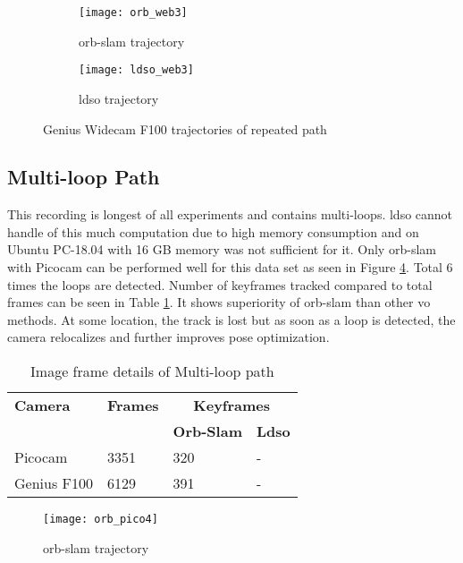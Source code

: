 \begin{figure}[H]
	\begin{subfigure}{.5\textwidth}
		\centering
		\texttt{[image: orb\_web3]}
		\caption{\acrshort{orb}-\acrshort{slam} trajectory}
		\label{fig:orb_web3}
	\end{subfigure}%
	\begin{subfigure}{.5\textwidth}
		\centering
		\texttt{[image: ldso\_web3]}
		\caption{\acrshort{ldso} trajectory}
		\label{fig:ldso_web3}
	\end{subfigure}
	\caption{Genius Widecam F100 trajectories of repeated path}
	\label{fig:Web3}
\end{figure}

\subsection{Multi-loop Path}
This recording is longest of all experiments and contains multi-loops. \acrshort{ldso} cannot handle of this much computation due to high memory consumption and on Ubuntu PC-18.04 with 16 GB memory was not sufficient for it. Only \acrshort{orb}-\acrshort{slam} with Picocam can be performed well for this data set as seen in Figure \ref{fig:orb_pico4}. Total 6 times the loops are detected. Number of keyframes tracked compared to total frames can be seen in Table \ref{table:multi-loop}. It shows superiority of \acrshort{orb}-\acrshort{slam} than other \acrshort{vo} methods. At some location, the track is lost but as soon as a loop is detected, the camera relocalizes and further improves pose optimization. 
\begin{table}[H]
	\centering
	\renewcommand{\arraystretch}{1.5}
	\begin{tabular}{ l| l| l |l }
		\textbf{Camera} & \textbf{Frames} & \multicolumn{2}{c}{\textbf{Keyframes}}  \\    
		&      & \textbf{Orb-Slam}  & \textbf{Ldso}  \\
		\hline
		Picocam & 3351 & 320   & - \\ 
		\hline
		Genius F100 & 6129  &  391  & - \\ 
	\end{tabular}
	\caption{Image frame details of Multi-loop path}
	\label{table:multi-loop}
\end{table}

\begin{figure}[H]
	\centering
	\texttt{[image: orb\_pico4]}
	\caption{\acrshort{orb}-\acrshort{slam} trajectory}
	\label{fig:orb_pico4}
\end{figure}

